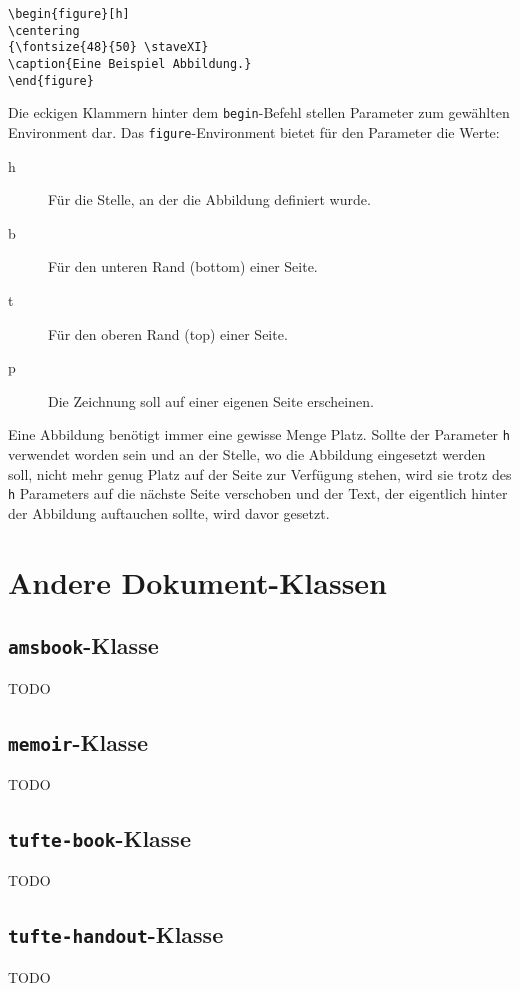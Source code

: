 \begin{verbatim}
\begin{figure}[h]
\centering
{\fontsize{48}{50} \staveXI}
\caption{Eine Beispiel Abbildung.}
\end{figure}
\end{verbatim}
Die eckigen Klammern hinter dem \texttt{begin}-Befehl stellen Parameter zum gewählten Environment dar. Das \texttt{figure}-Environment bietet für den Parameter die Werte:
\begin{description}
\item[h] Für die Stelle, an der die Abbildung definiert wurde.
\item[b] Für den unteren Rand (bottom) einer Seite. 
\item[t] Für den oberen Rand (top) einer Seite.
\item[p] Die Zeichnung soll auf einer eigenen Seite erscheinen.
\end{description}
Eine Abbildung benötigt immer eine gewisse Menge Platz. Sollte der Parameter \texttt{h} verwendet worden sein und an der Stelle, wo die Abbildung eingesetzt werden soll, nicht mehr genug Platz auf der Seite zur Verfügung stehen, wird sie trotz des \texttt{h} Parameters auf die nächste Seite verschoben und der Text, der eigentlich hinter der Abbildung auftauchen sollte, wird davor gesetzt.

\section{Andere Dokument-Klassen}

\subsection{\texttt{amsbook}-Klasse}
TODO

\subsection{\texttt{memoir}-Klasse}
TODO

\subsection{\texttt{tufte-book}-Klasse}
TODO

\subsection{\texttt{tufte-handout}-Klasse}
TODO


